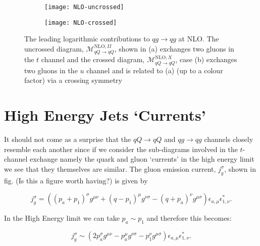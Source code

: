 		\begin{figure}[tpb]

			\centering
			\begin{subfigure}[b]{0.48\textwidth}
				\texttt{[image: NLO-uncrossed]}
				\caption{}
				\label{fig:NLO-uncrossed}
			\end{subfigure}
			\begin{subfigure}[b]{0.48\textwidth}
				\texttt{[image: NLO-crossed]}
				\caption{}
				\label{fig:NLO-crossed}
			\end{subfigure}
			\caption{The leading logarithmic contributions to $qg\rightarrow qg$ at NLO.  The uncrossed
 			         diagram, $\mathcal{M}_{qQ\rightarrow qQ}^{\text{NLO}, II}$, shown in (a) exchanges
 			         two gluons in the $t$ channel and the crossed diagram,
 			         $\mathcal{M}_{qQ\rightarrow qQ}^{\text{NLO}, X}$, case (b) exchanges two gluons
 			         in the $u$ channel and is related to (a) (up to a colour factor) via a crossing
 			         symmetry}
			\label{fig:NLO-leadingContrib.}
		\end{figure}

	\section{High Energy Jets `Currents'}
		\label{sub:currents}

		It should not come as a surprise that the $qQ\rightarrow qQ$ and $qg\rightarrow qg$ channels closely resemble
		each another since if we consider the sub-diagrams involved in the $t$-channel exchange namely the quark and
		gluon `currents' in the high energy limit we see that they themselves are similar.  The gluon emission
		current, $j_{g}^\sigma$, shown in fig. (Is this a figure worth having?) is given by

		\begin{equation}
			j_{g}^\sigma = \left((p_a+p_1)^\sigma g^{\mu\nu} + (q - p_1)^\mu g^{\nu\sigma} -
			(q + p_a)^\nu g^{\mu\sigma}\right)\epsilon_{a, \mu}\epsilon_{1, \nu}^*.
		\end{equation}

		In the High Energy limit we can take $p_a\sim p_1$ and therefore this becomes:

		\begin{equation}
			j_{g}^\sigma \sim \left(2p_a^\sigma g^{\mu\nu} - p_a^\mu g^{\nu\sigma} -
			p_1^\nu g^{\mu\sigma}\right)\epsilon_{a, \mu}\epsilon_{1, \nu}^*.
		\end{equation}

